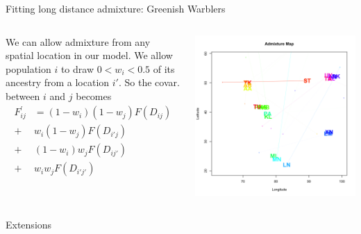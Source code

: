 \documentclass{beamer}
\begin{document}
\begin{frame}{Fitting long distance admixture: Greenish Warblers}

\begin{columns}
\begin{column}{0.4\textwidth}
We can allow admixture from any spatial location in our model. We
allow population $i$ to draw $0<w_i<0.5$ of its ancestry from a
location $i'$. So the covar. between $i$ and $j$ becomes
\begin{align*}
F_{ij}^{\prime}  & = (1-w_i)(1-w_j) F(D_{ij})  \\
+ & w_i(1-w_j)F(D_{i'j})\\
+ & (1-w_i)w_j F(D_{ij'}) \\
+ & w_iw_j F(D_{i'j'})
\end{align*}
\end{column}
\begin{column}{0.6\textwidth}
\pause 

	\begin{center} \includegraphics[width=
          0.9 \textwidth]{../smbe_spacemix_figs/procrustes_warbler_admix_map_for_graham_talk}
 \end{center}
\end{column}
\end{columns}
\end{frame}


\begin{frame}{Extensions}

\end{frame}
\end{document}
